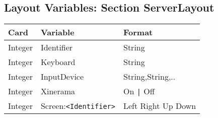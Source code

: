 \subsection{Layout Variables: Section ServerLayout}
\begin{tabular}[h]{|p{2cm}|p{4cm}|p{7cm}|}
 \hline
 \textbf{Card} & \textbf{Variable}     & \textbf{Format}        \\
 \hline
 Integer & Identifier                 & String                   \\
 Integer & Keyboard                   & String                   \\
 Integer & InputDevice                & String,String,..         \\
 Integer & Xinerama                   & On \verb+|+ Off          \\
 Integer & Screen:\verb+<Identifier>+ & Left Right Up Down  \\
 \hline
\end{tabular}

